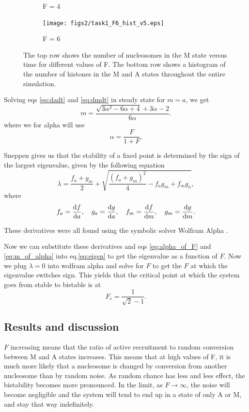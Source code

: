 \documentclass[fleqn,10pt]{SelfArx} %
\begin{document}
\begin{figure}[ht]
\begin{subfigure}[b]{.3\textwidth}
		\caption{F = 4}
		\label{fig:task1_F4_hist}
	\end{subfigure}
	\begin{subfigure}[b]{.3\textwidth}
		\centering
		\texttt{[image: figs2/task1\_F6\_hist\_v5.eps]}
		\caption{F = 6}
		\label{fig:task1_F6_hist}
	\end{subfigure}
		\caption{The top row shows the number of nucleosomes in the M state versus time for different values of F. The bottom row shows a histogram of the number of histones in the M and A states throughout the entire simulation. }
		\label{fig:task1}
\end{figure}

Solving eqs \eqref{eq:dadt} and \eqref{eq:dmdt} in steady state for $m=a$, we get 
\begin{equation}
	m = \frac{\sqrt{3\alpha^2 - 6\alpha + 4} + 3\alpha - 2}{6\alpha}.
	\label{eq:m_of_alpha}
\end{equation}
where we for alpha will use 
\begin{equation}
	\alpha = \frac{F}{1 + F}.
\label{eq:alpha_of_F}
\end{equation}


Sneppen \cite{book} gives us that the stability of a fixed point is determined by the sign of the largest eigenvalue, given by the following equation
\begin{equation}
	\lambda = \frac{f_a + g_m}{2}  + \sqrt{\frac{\left(f_a + g_m\right)^2}{4} - f_ag_m + f_mg_a},
	\label{eq:eigen}
\end{equation}
where
\begin{equation}
	f_a = \dv{f}{a},\quad
	g_a = \dv{g}{a},\quad
	f_m = \dv{f}{m},\quad
	g_m = \dv{g}{m}.
\end{equation}

These derivatives were all found using the symbolic solver Wolfram Alpha \cite{wolfram}. 

Now we can substitute these derivatives and eqs \eqref{eq:alpha_of_F} and \eqref{eq:m_of_alpha} into eq.\eqref{eq:eigen} to get the eigenvalue as a function of $F$. Now we plug $\lambda = 0$ into wolfram alpha \cite{wolfram} and solve for $F$ to get the $F$ at which the eigenvalue switches sign. This yields that the critical point at which the system goes from stable to bistable is at
\begin{equation}
	F_c = \frac{1}{\sqrt{2} - 1}.
\end{equation}


\subsection{Results and discussion}
$F$ increasing means that the ratio of active recruitment to random conversion between M and A states increases. This means that at high values of F, it is much more likely that a nucleosome is changed by conversion from another nucleosome than by random noise. As random chance has less and less effect, the bistability becomes more pronounced. In the limit, as $F\to\infty$, the noise will become negligible and the system will tend to end up in a state of only A or M, and stay that way indefinitely. 
\end{document}

